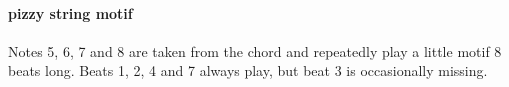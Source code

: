 \paragraph{pizzy string motif}
Notes 5, 6, 7 and 8 are taken from the chord and repeatedly play
a little motif 8 beats long. Beats 1, 2, 4 and 7 always play, but
beat 3 is occasionally missing. 